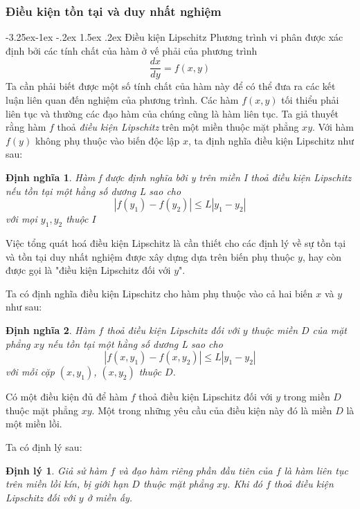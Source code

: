\documentclass[a4paper]{article}
\makeatletter
\newtheorem{theorem}{{\bf Định lý}}
\newtheorem{definition}{Định nghĩa}
\newcounter {subsubsubsection}[subsubsection]
\newcommand\subsubsubsection{\@startsection{subsubsubsection}{4}{\z@}%
                                     {-3.25ex\@plus -1ex \@minus -.2ex}%
                                     {1.5ex \@plus .2ex}%
                                     {\normalfont\normalsize\bfseries}}
\makeatother
\begin{document}
\subsubsection{Điều kiện tồn tại và duy nhất nghiệm}
\subsubsubsection{Điều kiện Lipschitz}
Phương trình vi phân được xác định bởi các tính chất của hàm ở vế phải của phương trình 
\[
    \dfrac{dx}{dy} = f(x,y)
\] 
Ta cần phải biết được một số tính chất của hàm này để có thể đưa ra các kết luận liên quan đến nghiệm của phương trình. Các hàm $f(x,y)$ tối thiểu phải liên tục và thường các đạo hàm của chúng cũng là hàm liên tục. Ta giả thuyết rằng hàm $f$ thoả \textit{điều kiện Lipschitz} trên một miền thuộc mặt phẳng $xy$. Với hàm $f(y)$ không phụ thuộc vào biến độc lập $x$, ta định nghĩa điều kiện Lipschitz như sau: \par
\begin{definition}
    Hàm f được định nghĩa bởi y trên miền I thoả điều kiện Lipschitz nếu tồn tại một hằng số dương L sao cho 
    \begin{equation}\label{eq:lipschitz}
        |f(y_1) - f(y_2)| \leq L|y_1 - y_2| 
    \end{equation}
    với mọi $y_1, y_2$ thuộc $I$
\end{definition}
Việc tổng quát hoá điều kiện Lipschitz là cần thiết cho các định lý về sự tồn tại và tồn tại duy nhất nghiệm được xây dựng dựa trên biến phụ thuộc $y$, hay còn được gọi là "điều kiện Lipschitz đối với $y$". \par
Ta có định nghĩa điều kiện Lipschitz cho hàm phụ thuộc vào cả hai biến $x$ và $y$ như sau:
\begin{definition}
    Hàm $f$ thoả điều kiện Lipschitz đối với $y$ thuộc miền $D$ của mặt phẳng $xy$ nếu tồn tại một hằng số dương L sao cho 
    \begin{equation}\label{eq:lipschitz_generalize}
        |f(x, y_1) - f(x, y_2)| \leq L|y_1 - y_2| 
    \end{equation}
    với mỗi cặp $(x,y_1)$, $(x,y_2)$ thuộc $D$.
\end{definition}
Có một điều kiện đủ để hàm $f$ thoả điều kiện Lipschitz đối với $y$ trong miền $D$ thuộc mặt phẳng $xy$. Một trong những yêu cầu của điều kiện này đó là miền $D$ là một miền lồi. \par
Ta có định lý sau:
\begin{theorem}
Giả sử hàm $f$ và đạo hàm riêng phần đầu tiên của $f$ là hàm liên tục trên miền lồi kín, bị giới hạn $D$ thuộc mặt phẳng $xy$. Khi đó $f$ thoả điều kiện Lipschitz đối với $y$ ở miền ấy.
\end{theorem} \par
\end{document}
